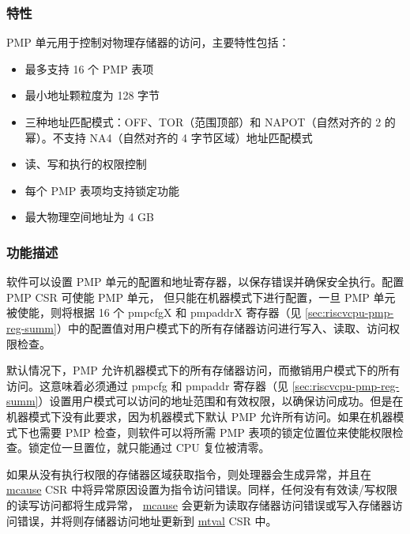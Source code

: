 \documentclass[main\_\_CN.tex]{subfiles}
\begin{document}
\subsubsection{特性}
\label{sec:riscvcpu-pmp-features}

PMP 单元用于控制对物理存储器的访问，主要特性包括：

\begin{itemize}
    \item 最多支持 16 个 PMP 表项
    \item 最小地址颗粒度为 128 字节
    \item 三种地址匹配模式：OFF、TOR（范围顶部）和 NAPOT（自然对齐的 2 的幂）。不支持 NA4（自然对齐的 4 字节区域）地址匹配模式
    \item 读、写和执行的权限控制
    \item 每个 PMP 表项均支持锁定功能
    \item 最大物理空间地址为 4 GB
\end{itemize}

\subsubsection{功能描述}
\label{sec:riscvcpu-pmp-func-descr}

软件可以设置 PMP 单元的配置和地址寄存器，以保存错误并确保安全执行。配置 PMP CSR 可使能 PMP 单元， 但只能在机器模式下进行配置，一旦 PMP 单元被使能，则将根据 16 个 pmpcfgX 和 pmpaddrX 寄存器（见 \ref{sec:riscvcpu-pmp-reg-summ}）中的配置值对用户模式下的所有存储器访问进行写入、读取、访问权限检查。

默认情况下，PMP 允许机器模式下的所有存储器访问，而撤销用户模式下的所有访问。这意味着必须通过 pmpcfg 和 pmpaddr 寄存器（见 \ref{sec:riscvcpu-pmp-reg-summ}）设置用户模式可以访问的地址范围和有效权限，以确保访问成功。但是在机器模式下没有此要求，因为机器模式下默认 PMP 允许所有访问。如果在机器模式下也需要 PMP 检查，则软件可以将所需 PMP 表项的锁定位置位来使能权限检查。锁定位一旦置位，就只能通过 CPU 复位被清零。

如果从没有执行权限的存储器区域获取指令，则处理器会生成异常，并且在 \hyperref[regdesc:MCAUSE]{mcause} CSR 中将异常原因设置为指令访问错误。同样，任何没有有效读/写权限的读写访问都将生成异常， \hyperref[regdesc:MCAUSE]{mcause} 会更新为读取存储器访问错误或写入存储器访问错误，并将则存储器访问地址更新到 \hyperref[regdesc:MTVAL]{mtval} CSR 中。


\newpage
\hypertarget{riscvcpu-pmp-reg-summ}{}
\end{document}

